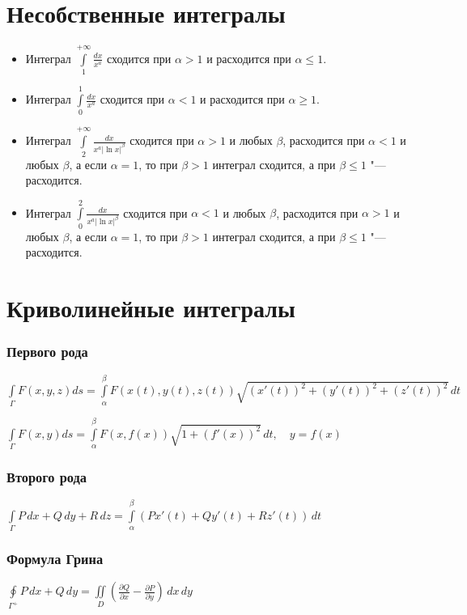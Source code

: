 \section{Несобственные интегралы}
\begin{itemize}
\item
Интеграл $\int\limits_{1}^{+\infty} \frac{dx}{x^a}$ сходится при $\alpha > 1$ и расходится при $\alpha \le 1$.
\item 
Интеграл $\int\limits_{0}^{1} \frac{dx}{x^a}$ сходится при $\alpha < 1$ и расходится при $\alpha \ge 1$.
\item
Интеграл $\int\limits_{2}^{+\infty} \frac{dx}{x^a |\ln x|^{\beta}}$ сходится при $\alpha > 1$ и любых $\beta$, расходится при $\alpha < 1$ и любых $\beta$, а если $\alpha = 1$, то при $\beta > 1$ интеграл сходится, а при $\beta \le 1$ "--- расходится.
\item 
Интеграл $\int\limits_{0}^{2} \frac{dx}{x^a |\ln x|^{\beta}}$ сходится при $\alpha < 1$ и любых $\beta$, расходится при $\alpha > 1$ и любых $\beta$, а если $\alpha = 1$, то при $\beta > 1$ интеграл сходится, а при $\beta \le 1$ "--- расходится.
\end{itemize}

\section{Криволинейные интегралы}
\subsubsection{Первого рода}
$\int\limits_{\Gamma} F(x,y,z) ds = \int\limits_{\alpha}^{\beta} F(x(t),y(t),z(t))\sqrt{(x'(t))^2+(y'(t))^2+(z'(t))^2}\,dt$

$\int\limits_{\Gamma} F(x,y) ds = \int\limits_{\alpha}^{\beta} F(x,f(x))\sqrt{1+(f'(x))^2}\,dt, \quad y=f(x)$

\subsubsection{Второго рода}
$\int\limits_{\Gamma} P\,dx+Q\,dy+R\,dz=\int\limits_{\alpha}^{\beta} \left(P x'(t)+ Q y'(t)+ R z'(t)\right)\,dt$

\subsubsection{Формула Грина}
$\oint\limits_{\Gamma ^{+}} P \,dx + Q \,dy = \iint\limits_{D} \left( \frac{\partial Q}{\partial x} - \frac{\partial P}{\partial y} \right) \,dx\,dy$

